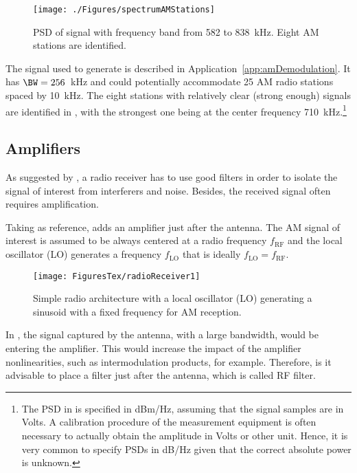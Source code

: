 \begin{figure}[htb]
\centering
\texttt{[image: ./Figures/spectrumAMStations]}
\caption{PSD of signal with frequency band from 582 to 838~kHz. Eight AM stations are identified.\label{fig:spectrumAMStations}}
\end{figure}

The signal used to generate  is described in Application~\ref{app:amDemodulation}. It has $\BW=256$~kHz and could potentially accommodate 25 AM radio stations spaced by 10~kHz. The eight stations with relatively clear (strong enough) signals are identified in , with the strongest one being at the center frequency 710~kHz.\footnote{The PSD in  is specified in dBm/Hz, assuming that the signal samples are in Volts. A calibration procedure of the measurement equipment is often necessary to actually obtain the amplitude in Volts or other unit. Hence, it is very common to specify PSDs in dB/Hz given that the correct absolute power is unknown.}

\subsection{Amplifiers}
As suggested by , a radio receiver has to use good filters in order to isolate the signal of interest from interferers and noise. Besides, the received signal often requires amplification.

Taking  as reference,  adds an amplifier just after the antenna. The AM signal of interest is assumed to be always centered at a radio frequency $f_{\textrm{RF}}$ and the local oscillator (LO) generates a frequency $f_{\textrm{LO}}$ that is ideally
$f_{\textrm{LO}} = f_{\textrm{RF}}$.

\begin{figure}[htbp]
	\centering
		\texttt{[image: FiguresTex/radioReceiver1]}		
	\caption{Simple radio architecture with a local oscillator (LO) generating a sinusoid with a fixed frequency for AM reception.\label{fig:radioReceiver1}}
\end{figure}

In , the signal captured by the antenna, with a large bandwidth, would be entering the amplifier. This would increase the impact of the amplifier nonlinearities, such as intermodulation products, for example. Therefore, is it advisable to place a filter just after the antenna, which is called RF filter.

